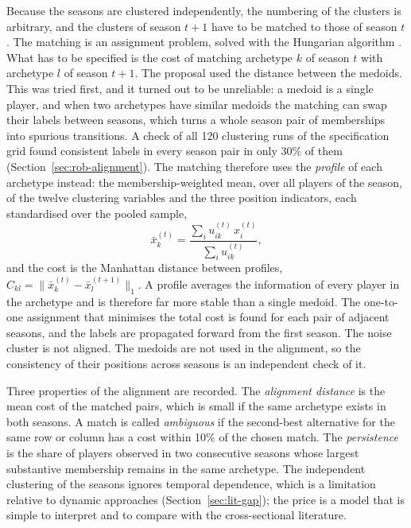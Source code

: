 Because the seasons are clustered independently, the numbering of the clusters is arbitrary, and the clusters of season $t+1$ have to be matched to those of season $t$. The matching is an assignment problem, solved with the Hungarian algorithm \cite{kuhn1955hungarian}. What has to be specified is the cost of matching archetype $k$ of season $t$ with archetype $l$ of season $t+1$. The proposal used the distance between the medoids. This was tried first, and it turned out to be unreliable: a medoid is a single player, and when two archetypes have similar medoids the matching can swap their labels between seasons, which turns a whole season pair of memberships into spurious transitions. A check of all 120 clustering runs of the specification grid found consistent labels in every season pair in only 30\% of them (Section~\ref{sec:rob-alignment}). The matching therefore uses the \emph{profile} of each archetype instead: the membership-weighted mean, over all players of the season, of the twelve clustering variables and the three position indicators, each standardised over the pooled sample,
\begin{equation}
	\bar x_{k}^{(t)}=\frac{\sum_i u_{ik}^{(t)}\,x_i^{(t)}}{\sum_i u_{ik}^{(t)}},
\end{equation}
and the cost is the Manhattan distance between profiles, $C_{kl}=\lVert \bar x_{k}^{(t)}-\bar x_{l}^{(t+1)}\rVert_1$. A profile averages the information of every player in the archetype and is therefore far more stable than a single medoid. The one-to-one assignment that minimises the total cost is found for each pair of adjacent seasons, and the labels are propagated forward from the first season. The noise cluster is not aligned. The medoids are not used in the alignment, so the consistency of their positions across seasons is an independent check of it.

Three properties of the alignment are recorded. The \emph{alignment distance} is the mean cost of the matched pairs, which is small if the same archetype exists in both seasons. A match is called \emph{ambiguous} if the second-best alternative for the same row or column has a cost within 10\% of the chosen match. The \emph{persistence} is the share of players observed in two consecutive seasons whose largest substantive membership remains in the same archetype. The independent clustering of the seasons ignores temporal dependence, which is a limitation relative to dynamic approaches (Section~\ref{sec:lit-gap}); the price is a model that is simple to interpret and to compare with the cross-sectional literature.

